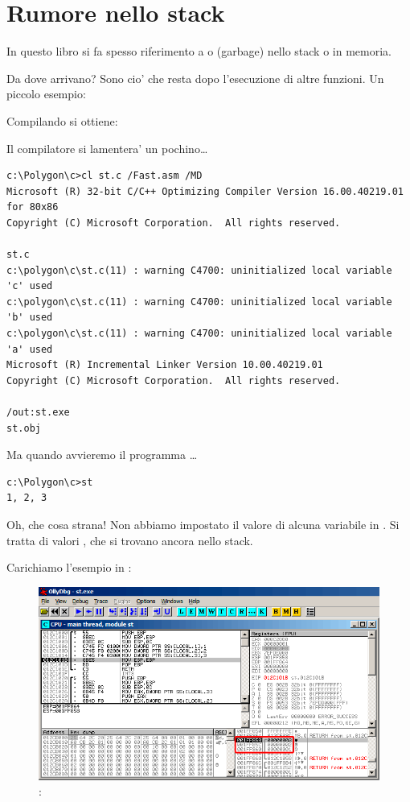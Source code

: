 \section{Rumore nello stack}

In questo libro si fa spesso riferimento a  o  (garbage) nello stack o in memoria.

Da dove arrivano?
Sono cio' che resta dopo l'esecuzione di altre funzioni.
Un piccolo esempio:



Compilando si ottiene:



Il compilatore si lamentera' un pochino\dots

\begin{lstlisting}
c:\Polygon\c>cl st.c /Fast.asm /MD
Microsoft (R) 32-bit C/C++ Optimizing Compiler Version 16.00.40219.01 for 80x86
Copyright (C) Microsoft Corporation.  All rights reserved.

st.c
c:\polygon\c\st.c(11) : warning C4700: uninitialized local variable 'c' used
c:\polygon\c\st.c(11) : warning C4700: uninitialized local variable 'b' used
c:\polygon\c\st.c(11) : warning C4700: uninitialized local variable 'a' used
Microsoft (R) Incremental Linker Version 10.00.40219.01
Copyright (C) Microsoft Corporation.  All rights reserved.

/out:st.exe
st.obj
\end{lstlisting}

Ma quando avvieremo il programma \dots

\begin{lstlisting}
c:\Polygon\c>st
1, 2, 3
\end{lstlisting}

Oh, che cosa strana! Non abbiamo impostato il valore di alcuna variabile in . 
Si tratta di valori  , che si trovano ancora nello stack.

\clearpage
Carichiamo l'esempio in \olly:

\begin{figure}[H]
\centering
\includegraphics[scale=\FigScale]{patterns/02_stack/08_noise/olly1.png}
\caption{\olly: }
\label{fig:stack_noise_olly1}
\end{figure}

